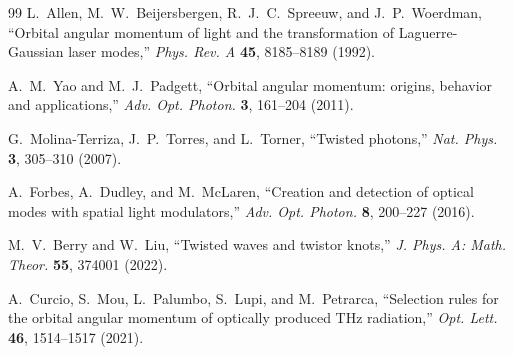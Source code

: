 \documentclass[a4paper,12pt]{article}
\begin{document}
\begin{thebibliography}{99}
L.~Allen, M.~W.~Beijersbergen, R.~J.~C.~Spreeuw, and J.~P.~Woerdman,
``Orbital angular momentum of light and the transformation of Laguerre-Gaussian laser modes,''
\textit{Phys. Rev. A} \textbf{45}, 8185--8189 (1992).

A.~M.~Yao and M.~J.~Padgett,
``Orbital angular momentum: origins, behavior and applications,''
\textit{Adv. Opt. Photon.} \textbf{3}, 161--204 (2011).

G.~Molina-Terriza, J.~P.~Torres, and L.~Torner,
``Twisted photons,''
\textit{Nat. Phys.} \textbf{3}, 305--310 (2007).

A.~Forbes, A.~Dudley, and M.~McLaren,
``Creation and detection of optical modes with spatial light modulators,''
\textit{Adv. Opt. Photon.} \textbf{8}, 200--227 (2016).

M.~V.~Berry and W.~Liu,
``Twisted waves and twistor knots,''
\textit{J. Phys. A: Math. Theor.} \textbf{55}, 374001 (2022).

A.~Curcio, S.~Mou, L.~Palumbo, S.~Lupi, and M.~Petrarca,
``Selection rules for the orbital angular momentum of optically produced THz radiation,''
\textit{Opt. Lett.} \textbf{46}, 1514--1517 (2021).
\end{thebibliography}
\end{document}
